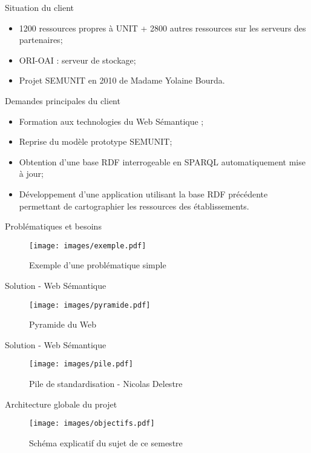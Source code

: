 \speaker{\Eva{}}
\begin{frame}{Situation du client}
	\begin{itemize}
	  \item 1200 ressources propres à UNIT + 2800 autres ressources sur les serveurs des partenaires;
	  \item ORI-OAI : serveur de stockage;
	  \item Projet SEMUNIT en 2010 de Madame Yolaine Bourda.
	\end{itemize}
\end{frame}

\begin{frame}{Demandes principales du client}

\begin{itemize}
	  \item Formation aux technologies du Web Sémantique ;
	  \item Reprise du modèle prototype SEMUNIT;
	  \item Obtention d'une base RDF interrogeable en SPARQL automatiquement mise à jour;
	  \item Développement d'une application utilisant la base RDF précédente permettant de cartographier les ressources des établissements.
	\end{itemize}
  
\end{frame}


\begin{frame}{Problématiques et besoins}
	\begin{figure}
	  \centering
	  \texttt{[image: images/exemple.pdf]}
	  \caption{Exemple d'une problématique simple}
	\end{figure}
	
\end{frame}

\speaker{\Alexandre{}}
\begin{frame}{Solution -  Web Sémantique}
	\begin{figure}
	  \centering
	  \texttt{[image: images/pyramide.pdf]}
	  \caption{Pyramide du Web}
	\end{figure}
	
\end{frame}


\begin{frame}{Solution - Web Sémantique}
	\begin{figure}
	  \centering
	  \texttt{[image: images/pile.pdf]}
	  \caption{Pile de standardisation - Nicolas Delestre}
	\end{figure}
\end{frame}

\speaker{\Eva{}}


\begin{frame}{Architecture globale du projet}

	
	\begin{figure}
	  \centering
	  \texttt{[image: images/objectifs.pdf]}
	  \caption{Schéma explicatif du sujet de ce semestre}
	\end{figure}

\end{frame}
